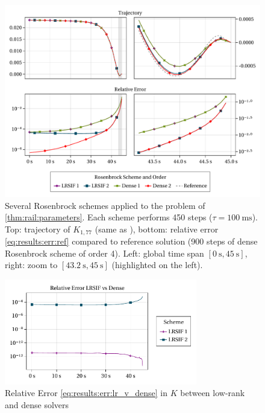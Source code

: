 \begin{figure}[tp]
  \includegraphics[width=\textwidth]{figures/fig_results_sequential.pdf}
  \caption[Rosenbrock method applied to Rail problem]{%
    Several Rosenbrock schemes applied to the problem of \autoref{thm:rail:parameters}.
    Each scheme performs 450 steps ($\tau = \SI{100}{\milli\second}$).
    Top: trajectory of $K_{1,77}$ (same as \cite[Fig.~1]{Lang2015}),
    bottom: relative error \eqref{eq:results:err:ref} compared to reference solution
    (900 steps of dense Rosenbrock scheme of order 4).
    Left: global time span $[\SI{0}{\second}, \SI{45}{\second}]$,
    right: zoom to $[\SI[round-mode=off]{43.2}{\second}, \SI{45}{\second}]$ (highlighted on the left).
  }
  \label{fig:results:sequential:rail}
\end{figure}

\begin{figure}[tp]
  \centering
  \includegraphics[width=0.75\textwidth]{figures/fig_results_sequential_err.pdf}
  \caption{Relative Error \eqref{eq:results:err:lr_v_dense} in $K$ between low-rank and dense solvers}
  \label{fig:results:sequential:err}
\end{figure}

